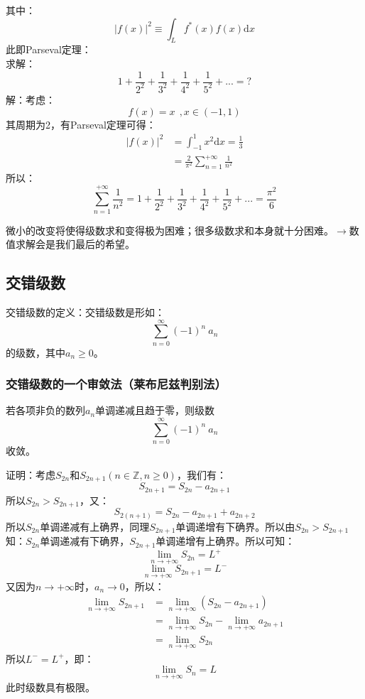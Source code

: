 \begin{enumerate}
\begin{equation}
	    \end{equation}
	    其中：
	    \[\left|f(x)\right|^2 \equiv \int_L f^*(x)f(x)\mathrm{d}x\]
	    此即Parseval定理：\\
	    求解：
	    \[1+\frac{1}{2^2}+\frac{1}{3^2}+\frac{1}{4^2}+\frac{1}{5^2}+... = ?\]
	    解：考虑：
	    \[f(x) = x \ \ ,x\in(-1,1)\]
	    其周期为2，有Parseval定理可得：
	    \[
	    \begin{split}
	    \left|f(x)\right|^2 &= \int_{-1}^{1}x^2\mathrm{d}x = \frac{1}{3}\\
	                        &= \frac{2}{\pi^2} \sum_{n=1}^{+\infty}\frac{1}{n^2}
	    \end{split}
	    \]
	    所以：
	    \begin{equation}
	    \sum_{n=1}^{+\infty} \frac{1}{n^2} = 1+\frac{1}{2^2}+\frac{1}{3^2}+\frac{1}{4^2}+\frac{1}{5^2}+... = \frac{\pi^2}{6}
	    \end{equation}
\end{enumerate}

微小的改变将使得级数求和变得极为困难；很多级数求和本身就十分困难。$\rightarrow$数值求解会是我们最后的希望。

\subsection{交错级数}

交错级数的定义：交错级数是形如：
\[\sum_{n=0}^\infty (-1)^n\ a_n\]
的级数，其中$a_n \ge 0$。

\subsubsection{交错级数的一个审敛法（莱布尼兹判别法）}

若各项非负的数列$a_n$单调递减且趋于零，则级数
\[\sum_{n=0}^\infty (-1)^n\ a_n\]
收敛。

证明：考虑$S_{2n}$和$S_{2n+1}(n\in \mathbb{Z},n \ge 0)$，我们有：
\[S_{2n+1} = S_{2n}-a_{2n+1}\]
所以$S_{2n} > S_{2n+1}$，又：
\[S_{2(n+1)} = S_{2n}-a_{2n+1}+a_{2n+2}\]
所以$S_{2n}$单调递减有上确界，同理$S_{2n+1}$单调递增有下确界。所以由$S_{2n} > S_{2n+1}$知：$S_{2n}$单调递减有下确界，$S_{2n+1}$单调递增有上确界。所以可知：
\[\lim\limits_{n\rightarrow+\infty}S_{2n} = L^+\]
\[\lim\limits_{n\rightarrow+\infty}S_{2n+1} = L^-\]
又因为$n\rightarrow+\infty$时，$a_n\rightarrow0$，所以：
\[
\begin{split}
\lim\limits_{n\rightarrow+\infty}S_{2n+1} &= \lim\limits_{n\rightarrow+\infty}(S_{2n}-a_{2n+1})\\
&= \lim\limits_{n\rightarrow+\infty}S_{2n}-\lim\limits_{n\rightarrow+\infty}a_{2n+1}\\
&= \lim\limits_{n\rightarrow+\infty}S_{2n}
\end{split}\]
所以$L^-=L^+$，即：
\[\lim\limits_{n\rightarrow+\infty}S_{n} = L\]
此时级数具有极限。
